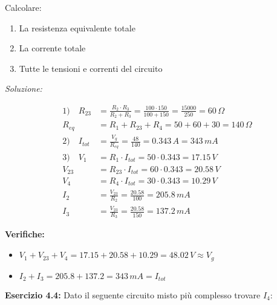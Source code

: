\documentclass[a4paper,12pt]{article}
\begin{document}
Calcolare:
\begin{enumerate}
    \item La resistenza equivalente totale
    \item La corrente totale
    \item Tutte le tensioni e correnti del circuito
\end{enumerate}

\textit{Soluzione:}

\begin{align*}
1)\quad R_{23} &= \frac{R_2 \cdot R_3}{R_2 + R_3} = \frac{100 \cdot 150}{100 + 150} = \frac{15000}{250} = 60\,\Omega \\
R_{eq} &= R_1 + R_{23} + R_4 = 50 + 60 + 30 = 140\,\Omega \\
2)\quad I_{tot} &= \frac{V_g}{R_{eq}} = \frac{48}{140} = 0.343\,A = 343\,mA \\
3)\quad V_1 &= R_1 \cdot I_{tot} = 50 \cdot 0.343 = 17.15\,V \\
V_{23} &= R_{23} \cdot I_{tot} = 60 \cdot 0.343 = 20.58\,V \\
V_4 &= R_4 \cdot I_{tot} = 30 \cdot 0.343 = 10.29\,V \\
I_2 &= \frac{V_{23}}{R_2} = \frac{20.58}{100} = 205.8\,mA \\
I_3 &= \frac{V_{23}}{R_3} = \frac{20.58}{150} = 137.2\,mA
\end{align*}

\textbf{Verifiche:}
\begin{itemize}
    \item $V_1 + V_{23} + V_4 = 17.15 + 20.58 + 10.29 = 48.02\,V \approx V_g$ \checkmark
    \item $I_2 + I_3 = 205.8 + 137.2 = 343\,mA = I_{tot}$ \checkmark
\end{itemize}


\textbf{Esercizio 4.4:} Dato il seguente circuito misto più complesso trovare $I_4$: 
\end{document}
